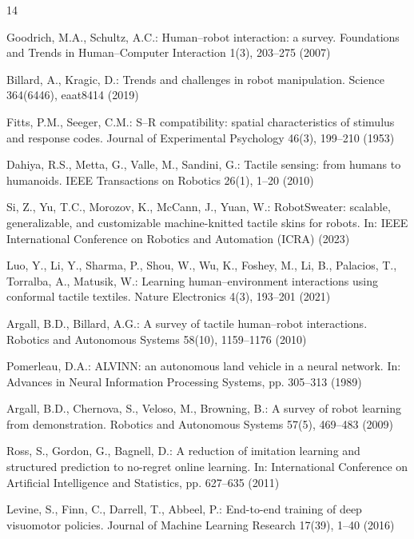 \documentclass[runningheads]{llncs}
\begin{document}
\begin{thebibliography}{14}

Goodrich, M.A., Schultz, A.C.: Human--robot interaction: a survey.
Foundations and Trends in Human--Computer Interaction 1(3), 203--275
(2007)

Billard, A., Kragic, D.: Trends and challenges in robot manipulation.
Science 364(6446), eaat8414 (2019)

Fitts, P.M., Seeger, C.M.: S--R compatibility: spatial characteristics of
stimulus and response codes. Journal of Experimental Psychology 46(3),
199--210 (1953)

Dahiya, R.S., Metta, G., Valle, M., Sandini, G.: Tactile sensing: from
humans to humanoids. IEEE Transactions on Robotics 26(1), 1--20 (2010)

Si, Z., Yu, T.C., Morozov, K., McCann, J., Yuan, W.: RobotSweater:
scalable, generalizable, and customizable machine-knitted tactile skins
for robots. In: IEEE International Conference on Robotics and Automation
(ICRA) (2023)

Luo, Y., Li, Y., Sharma, P., Shou, W., Wu, K., Foshey, M., Li, B.,
Palacios, T., Torralba, A., Matusik, W.: Learning human--environment
interactions using conformal tactile textiles. Nature Electronics 4(3),
193--201 (2021)

Argall, B.D., Billard, A.G.: A survey of tactile human--robot
interactions. Robotics and Autonomous Systems 58(10), 1159--1176 (2010)

Pomerleau, D.A.: ALVINN: an autonomous land vehicle in a neural network.
In: Advances in Neural Information Processing Systems, pp. 305--313
(1989)

Argall, B.D., Chernova, S., Veloso, M., Browning, B.: A survey of robot
learning from demonstration. Robotics and Autonomous Systems 57(5),
469--483 (2009)

Ross, S., Gordon, G., Bagnell, D.: A reduction of imitation learning and
structured prediction to no-regret online learning. In: International
Conference on Artificial Intelligence and Statistics, pp. 627--635 (2011)

Levine, S., Finn, C., Darrell, T., Abbeel, P.: End-to-end training of
deep visuomotor policies. Journal of Machine Learning Research 17(39),
1--40 (2016)


\end{thebibliography}
\end{document}
